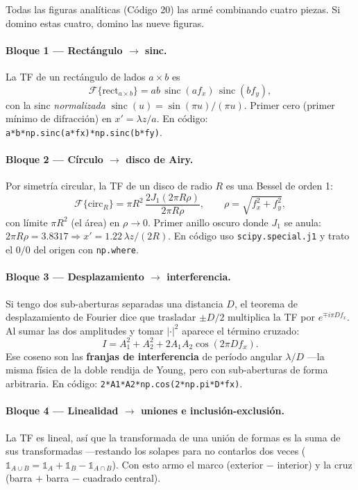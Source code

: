 \documentclass[11pt,a4paper]{article}
\newcommand{\sinc}{\operatorname{sinc}}
\newcommand{\Fou}{\mathcal{F}}
\begin{document}
Todas las figuras analíticas (Código 20) las armé combinando cuatro piezas. Si
domino estas cuatro, domino las nueve figuras.

\paragraph{Bloque 1 --- Rectángulo $\to$ sinc.}
La TF de un rectángulo de lados $a\times b$ es
\[
\Fou\{\text{rect}_{a\times b}\}=ab\,\sinc(a f_x)\,\sinc(b f_y),
\]
con la sinc \emph{normalizada} $\sinc(u)=\sin(\pi u)/(\pi u)$. Primer cero (primer
mínimo de difracción) en $x'=\lambda z/a$. En código:
\texttt{a*b*np.sinc(a*fx)*np.sinc(b*fy)}.

\paragraph{Bloque 2 --- Círculo $\to$ disco de Airy.}
Por simetría circular, la TF de un disco de radio $R$ es una Bessel de orden 1:
\[
\Fou\{\text{circ}_R\}=\pi R^2\,\frac{2 J_1(2\pi R\rho)}{2\pi R\rho},
\qquad \rho=\sqrt{f_x^2+f_y^2},
\]
con límite $\pi R^2$ (el área) en $\rho\to0$. Primer anillo oscuro donde
$J_1$ se anula: $2\pi R\rho=3.8317\Rightarrow x'=1.22\,\lambda z/(2R)$. En código
uso \texttt{scipy.special.j1} y trato el $0/0$ del origen con \texttt{np.where}.

\paragraph{Bloque 3 --- Desplazamiento $\to$ interferencia.}
Si tengo dos sub-aberturas separadas una distancia $D$, el teorema de
desplazamiento de Fourier dice que trasladar $\pm D/2$ multiplica la TF por
$e^{\mp i\pi D f_x}$. Al sumar las dos amplitudes y tomar $|\cdot|^2$ aparece el
término cruzado:
\begin{equation}
I = A_1^2 + A_2^2 + 2A_1 A_2\cos(2\pi D f_x).
\label{eq:interf}
\end{equation}
Ese coseno son las \textbf{franjas de interferencia} de período angular
$\lambda/D$ ---la misma física de la doble rendija de Young, pero con
sub-aberturas de forma arbitraria. En código: \texttt{2*A1*A2*np.cos(2*np.pi*D*fx)}.

\paragraph{Bloque 4 --- Linealidad $\to$ uniones e inclusión-exclusión.}
La TF es lineal, así que la transformada de una unión de formas es la suma de sus
transformadas ---restando los solapes para no contarlos dos veces
($\mathbb{1}_{A\cup B}=\mathbb{1}_A+\mathbb{1}_B-\mathbb{1}_{A\cap B}$). Con esto
armo el marco (exterior $-$ interior) y la cruz (barra $+$ barra $-$ cuadrado
central).
\end{document}
